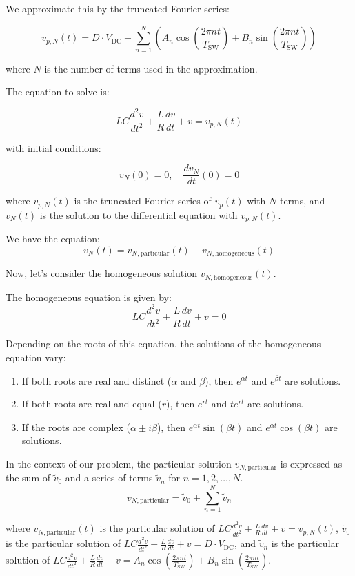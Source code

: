 \documentclass{article}
\begin{document}
We approximate this by the truncated Fourier series:

\[
v_{p,N}(t) = D \cdot V_{\text{DC}} + \sum_{n=1}^{N} \left( A_n \cos\left(\frac{2\pi n t}{T_{\text{SW}}}\right) + B_n \sin\left(\frac{2\pi n t}{T_{\text{SW}}}\right) \right)
\]

where \( N \) is the number of terms used in the approximation.

The equation to solve is:

\[
LC \frac{d^2 v}{dt^2} + \frac{L}{R} \frac{dv}{dt} + v = v_{p,N}(t)
\]

with initial conditions:

\[
v_{N}(0) = 0, \quad \frac{dv_{N}}{dt}(0) = 0
\]

where \( v_{p,N}(t) \) is the truncated Fourier series of \( v_p(t) \) with \( N \) terms,
and \( v_{N}(t) \) is the solution to the differential equation with \( v_{p,N}(t) \).

We have the equation:
\begin{equation}
v_{N}(t) = v_{N,\text{particular}}(t) + v_{N,\text{homogeneous}}(t)
\end{equation}

Now, let's consider the homogeneous solution \(v_{N,\text{homogeneous}}(t)\). 

The homogeneous equation is given by:
\[
LC \frac{d^2 v}{dt^2} + \frac{L}{R} \frac{dv}{dt} + v = 0
\]

Depending on the roots of this equation, the solutions of the homogeneous equation vary:
\begin{enumerate}
    \item If both roots are real and distinct (\( \alpha \) and \( \beta \)), then \( e^{\alpha t} \) and \( e^{\beta t} \) are solutions.
    \item If both roots are real and equal (\( r \)), then \( e^{rt} \) and \( t e^{rt} \) are solutions.
    \item If the roots are complex (\( \alpha \pm i \beta \)), then \( e^{\alpha t} \sin(\beta t) \) and \( e^{\alpha t} \cos(\beta t) \) are solutions.
\end{enumerate}


In the context of our problem, the particular solution \( v_{N,\text{particular}} \) is expressed as the sum of \( \widetilde{v}_0 \) and a series of terms \( \widetilde{v}_n \) for \( n = 1, 2, \ldots, N \).
\[ v_{N,\text{particular}} = \widetilde{v}_0 + \sum_{n=1}^{N} \widetilde{v}_n \]

where \( {v}_{N,\text{particular}}(t) \) is the particular solution of \(LC \frac{d^2 v}{dt^2} + \frac{L}{R} \frac{dv}{dt} + v = v_{p,N}(t)\), \( \widetilde{v}_0 \) is the particular solution of \(LC \frac{d^2 v}{dt^2} + \frac{L}{R} \frac{dv}{dt} + v = D \cdot V_{\text{DC}}\), and \( \widetilde{v}_n \) is the particular solution of \(LC \frac{d^2 v}{dt^2} + \frac{L}{R} \frac{dv}{dt} + v = A_n \cos\left(\frac{2 \pi n t}{T_{\text{SW}}}\right) + B_n \sin\left(\frac{2 \pi n t}{T_{\text{SW}}}\right)\).
\end{document}
